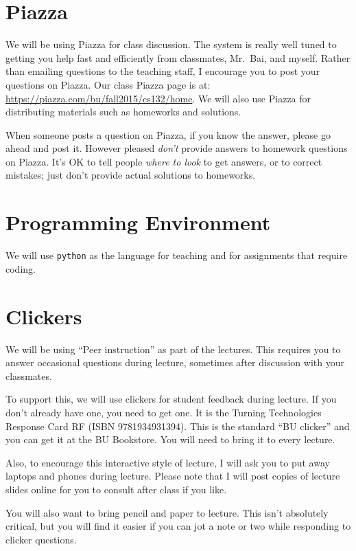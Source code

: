 \documentclass[11pt]{article}
\begin{document}
\section*{Piazza}

We will be using Piazza for class discussion. The system is really well
tuned to getting you help fast and efficiently from classmates, Mr.\ Bai,
and myself. Rather than emailing questions to the teaching staff,
I encourage you to post your questions on Piazza.   Our class Piazza
page  is at: \url{https://piazza.com/bu/fall2015/cs132/home}. 
We will also use Piazza for distributing materials
such as homeworks and solutions.

When someone posts a question on Piazza, if you know the answer, please
go ahead and post it.   However pleased \emph{don't} provide answers to homework
questions on Piazza.   It's OK to tell people \emph{where to look} to
get answers, or to correct mistakes;  just don't provide actual solutions
to homeworks.

\section*{Programming Environment}

We will use \texttt{python} as the language for teaching and for
assignments that require coding.  

\section*{Clickers}

We will be using ``Peer instruction'' as part of the lectures.  This
requires you to answer occasional questions during lecture, sometimes
after discussion with your classmates.   

To support this, we will use clickers for student feedback during lecture.  If you
don't already have one, you need to get one.  It is the Turning
Technologies Response Card RF (ISBN 9781934931394).  This is the
standard ``BU clicker'' and you can get it at
the BU Bookstore.   You will need to bring it to every lecture.

Also, to encourage this interactive style of lecture, I will ask you to
put away laptops and phones during lecture.    Please note that I will
post copies of lecture slides online for you to consult after class if
you like.

You will also want to bring pencil and paper to lecture.   This isn't
absolutely critical, but you will find it easier if you can jot a note
or two while responding to clicker questions.
\end{document}
